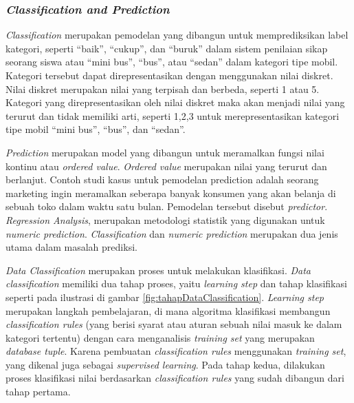 \subsubsection{\textsl{Classification and Prediction}}
\textsl{Classification} merupakan pemodelan yang dibangun untuk memprediksikan label kategori, seperti "`baik"', "`cukup"', dan "`buruk"' dalam sistem penilaian sikap seorang siswa atau "`mini bus"', "`bus"', atau "`sedan"' dalam kategori tipe mobil. Kategori tersebut dapat direpresentasikan dengan menggunakan nilai diskret. Nilai diskret merupakan nilai yang terpisah dan berbeda, seperti 1 atau 5. Kategori yang direpresentasikan oleh nilai diskret maka akan menjadi nilai yang terurut dan tidak memiliki arti, seperti 1,2,3 untuk merepresentasikan kategori tipe mobil "`mini bus"', "`bus"', dan "`sedan"'.

\textsl{Prediction} merupakan model yang dibangun untuk meramalkan fungsi nilai kontinu atau \textsl{ordered value}. \textsl{Ordered value} merupakan nilai yang terurut dan berlanjut. Contoh studi kasus untuk pemodelan prediction adalah seorang marketing ingin meramalkan seberapa banyak konsumen yang akan belanja di sebuah toko dalam waktu satu bulan. Pemodelan tersebut disebut \textsl{predictor}. \textsl{Regression Analysis}, merupakan metodologi statistik yang digunakan untuk \textsl{numeric prediction}. \textsl{Classification} dan \textsl{numeric prediction} merupakan dua jenis utama dalam masalah prediksi.

\textsl{Data Classification} merupakan proses untuk melakukan klasifikasi. \textsl{Data classification} memiliki dua tahap proses, yaitu \textsl{learning step} dan tahap klasifikasi seperti pada ilustrasi di gambar \ref{fig:tahapDataClassification}. \textsl{Learning step} merupakan langkah pembelajaran, di mana algoritma klasifikasi membangun \textsl{classification rules} (yang berisi syarat atau aturan sebuah nilai masuk ke dalam kategori tertentu) dengan cara menganalisis \textsl{training set} yang merupakan \textsl{database tuple}. Karena pembuatan \textsl{classification rules} menggunakan \textsl{training set}, yang dikenal juga sebagai \textsl{supervised learning}. 
Pada tahap kedua, dilakukan proses klasifikasi nilai berdasarkan \textsl{classification rules} yang sudah dibangun dari tahap pertama.

